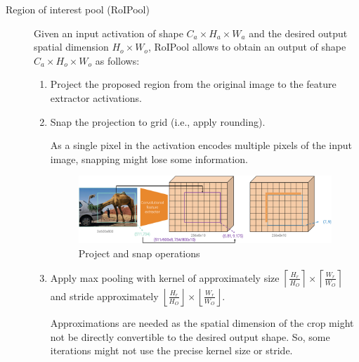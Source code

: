 \begin{description}
        \begin{description}
            \item[Region of interest pool (RoIPool)] 
                Given an input activation of shape $C_a \times H_a \times W_a$ and the desired output spatial dimension $H_o \times W_o$, RoIPool allows to obtain an output of shape $C_a \times H_o \times W_o$ as follows:
                \begin{enumerate}
                    \item Project the proposed region from the original image to the feature extractor activations.
                    \item Snap the projection to grid (i.e., apply rounding).
                        \begin{remark}
                            As a single pixel in the activation encodes multiple pixels of the input image, snapping might lose some information.
                        \end{remark}
                        \begin{figure}[H]
                            \raggedleft
                            \includegraphics[width=0.85\linewidth]{./img/_roipool_snap.pdf}
                            \caption{Project and snap operations}
                        \end{figure}
                    \item Apply max pooling with kernel of approximately size $\left\lceil \frac{H_r}{H_O} \right\rceil \times \left\lceil \frac{W_r}{W_O} \right\rceil$ and stride approximately $\left\lfloor \frac{H_r}{H_O} \right\rfloor \times \left\lfloor \frac{W_r}{W_O} \right\rfloor$.
                        \begin{remark}
                            Approximations are needed as the spatial dimension of the crop might not be directly convertible to the desired output shape. So, some iterations might not use the precise kernel size or stride.
                        \end{remark}
                        \begin{figure}[H]
                            \raggedleft

\end{figure}
\end{enumerate}
\end{description}
\end{description}
